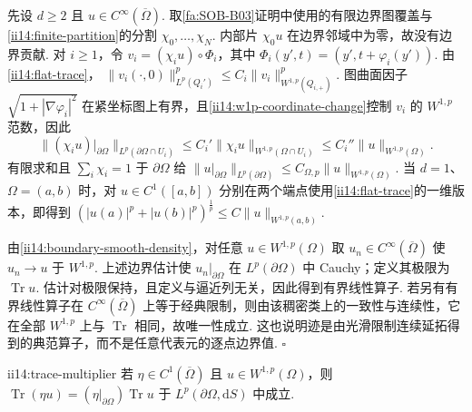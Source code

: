 \begin{FAProof}
先设 \(\displaystyle d\geqslant2\) 且 \(\displaystyle u\in C^\infty(\overline\Omega)\). 取\autoref{fa:SOB-B03}证明中使用的有限边界图覆盖与\autoref{ii14:finite-partition}的分割 \(\displaystyle\chi_0,\dots,\chi_N\). 内部片 \(\displaystyle\chi_0u\) 在边界邻域中为零，故没有边界贡献. 对 \(\displaystyle i\geqslant1\)，令 \(\displaystyle v_i=(\chi_i u)\circ\Phi_i\)，其中 \(\displaystyle\Phi_i(y',t)=(y',t+\varphi_i(y'))\). 由\autoref{ii14:flat-trace}， \(\displaystyle \|v_i(\cdot,0)\|_{L^p(Q_i')}^p \leqslant C_i\|v_i\|_{W^{1,p}(Q_{i,+})}^p.\)
图曲面因子 \(\displaystyle\sqrt{1+|\nabla\varphi_i|^2}\) 在紧坐标图上有界，且\autoref{ii14:w1p-coordinate-change}控制 \(\displaystyle v_i\) 的 \(\displaystyle W^{1,p}\) 范数，因此
\[
\|(\chi_i u)|_{\partial\Omega}\|_{L^p(\partial\Omega\cap U_i)}
\leqslant
C_i'\|\chi_i u\|_{W^{1,p}(\Omega\cap U_i)}
\leqslant
C_i''\|u\|_{W^{1,p}(\Omega)}.
\]
有限求和且 \(\displaystyle\sum_i\chi_i=1\) 于 \(\displaystyle\partial\Omega\) 给 \(\displaystyle \|u|_{\partial\Omega}\|_{L^p(\partial\Omega)} \leqslant C_{\Omega,p}\|u\|_{W^{1,p}(\Omega)}.\)
当 \(\displaystyle d=1\)、\(\displaystyle\Omega=(a,b)\) 时，对 \(\displaystyle u\in C^1([a,b])\) 分别在两个端点使用\autoref{ii14:flat-trace}的一维版本，即得到 \(\displaystyle(|u(a)|^p+|u(b)|^p)^{\frac{1}{p}}\leqslant C\|u\|_{W^{1,p}(a,b)}\).

由\autoref{ii14:boundary-smooth-density}，对任意 \(\displaystyle u\in W^{1,p}(\Omega)\) 取 \(\displaystyle u_n\in C^\infty(\overline\Omega)\) 使 \(\displaystyle u_n\to u\) 于 \(\displaystyle W^{1,p}\). 上述边界估计使 \(\displaystyle u_n|_{\partial\Omega}\) 在 \(\displaystyle L^p(\partial\Omega)\) 中 Cauchy；定义其极限为 \(\displaystyle\operatorname{Tr}u\). 估计对极限保持，且定义与逼近列无关，因此得到有界线性算子. 若另有有界线性算子在 \(\displaystyle C^\infty(\overline\Omega)\) 上等于经典限制，则由该稠密类上的一致性与连续性，它在全部 \(\displaystyle W^{1,p}\) 上与 \(\displaystyle\operatorname{Tr}\) 相同，故唯一性成立. 这也说明迹是由光滑限制连续延拓得到的典范算子，而不是任意代表元的逐点边界值.
\hfill\(\square\)
\end{FAProof}

\begin{FALemma}[B][光滑乘子与迹相容]{ii14:trace-multiplier}
若 \(\displaystyle\eta\in C^1(\overline\Omega)\) 且 \(\displaystyle u\in W^{1,p}(\Omega)\)，则 \(\displaystyle \operatorname{Tr}(\eta u)=(\eta|_{\partial\Omega})\operatorname{Tr}u\) 于 \(\displaystyle L^p(\partial\Omega,\mathrm{d}S)\) 中成立.
\end{FALemma}

